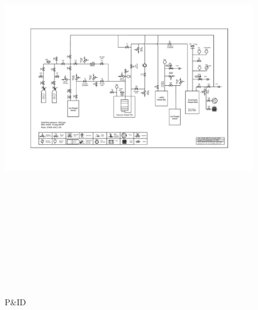 \documentclass[letterpaper,11pt]{article}
\begin{document}
\clearpage
\begin{figure}[htb]
\begin{center}
\includegraphics[angle=90,origin=c,height=7.3in]{fig/PIDv8.3.pdf}
\caption{P\&ID}
\label{fig:PID}
\end{center}
\end{figure}
\clearpage
\end{document}
